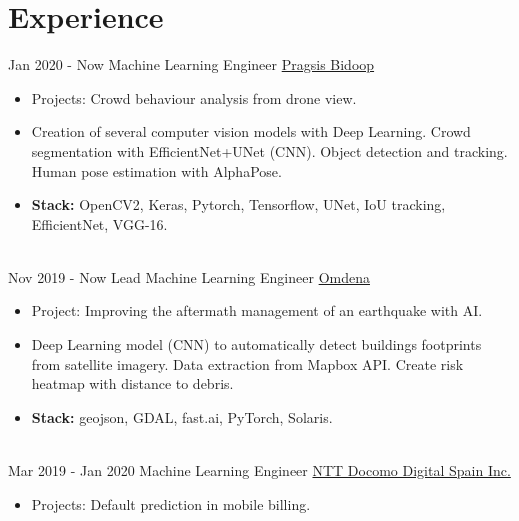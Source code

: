\documentclass[letterpaper]{twentysecondcv} %
\begin{document}
\makeprofile %




\section{Experience}
\begin{twenty} %

\twentyitem
    	{Jan 2020 - }
		{Now}
        {Machine Learning Engineer}
        {\href{https://pragsis.com/}{Pragsis Bidoop}}
        {}
        {\begin{itemize}
			\item Projects: Crowd behaviour analysis from drone view.
			\item Creation of several computer vision models with Deep Learning. Crowd segmentation with EfficientNet+UNet (CNN). Object detection and tracking. Human pose estimation with AlphaPose.
			\item \textbf{Stack:} OpenCV2, Keras, Pytorch, Tensorflow, UNet, IoU tracking, EfficientNet, VGG-16.
        \end{itemize}}
        \\
\twentyitem
    	{Nov 2019 - }
		{Now}
        {Lead Machine Learning Engineer}
        {\href{https://omdena.com}{Omdena}}
        {}
        {\begin{itemize}
			\item Project: Improving the aftermath management of an earthquake with AI.
			\item Deep Learning model (CNN) to automatically detect buildings footprints from satellite imagery. Data extraction from Mapbox API. Create risk heatmap with distance to debris.
			\item \textbf{Stack:} geojson, GDAL, fast.ai, PyTorch, Solaris.
        \end{itemize}}
        \\
\twentyitem
    	{Mar 2019 - }
		{Jan 2020}
        {Machine Learning Engineer}
        {\href{https://www.docomodigital.com/}{NTT Docomo Digital Spain Inc.}}
        {}
        {\begin{itemize}
        \item Projects: Default prediction in mobile billing. 

\end{itemize}}
\end{twenty}
\end{document}
